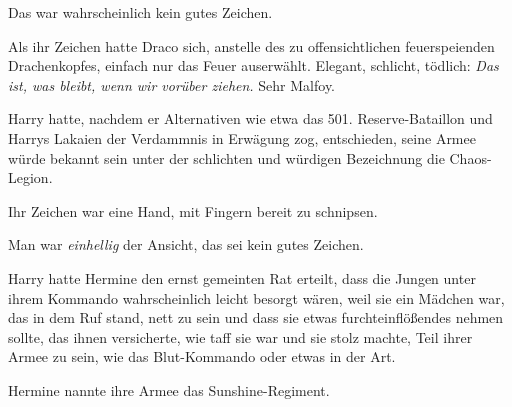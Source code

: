 Das war wahrscheinlich kein gutes Zeichen.

Als ihr Zeichen hatte Draco sich, anstelle des zu offensichtlichen feuerspeienden Drachenkopfes, einfach nur das Feuer auserwählt. Elegant, schlicht, tödlich: \emph{Das ist, was bleibt, wenn wir vorüber ziehen.} Sehr Malfoy.

Harry hatte, nachdem er Alternativen wie etwa das 501. Reserve-Bataillon und Harrys Lakaien der Verdammnis in Erwägung zog, entschieden, seine Armee würde bekannt sein unter der schlichten und würdigen Bezeichnung die Chaos-Legion.%

Ihr Zeichen war eine Hand, mit Fingern bereit zu schnipsen.

Man war \emph{einhellig} der Ansicht, das sei kein gutes Zeichen.

Harry hatte Hermine den ernst gemeinten Rat erteilt, dass die Jungen unter ihrem Kommando wahrscheinlich leicht besorgt wären, weil sie ein Mädchen war, das in dem Ruf stand, nett zu sein und dass sie etwas furchteinflößendes nehmen sollte, das ihnen versicherte, wie taff sie war und sie stolz machte, Teil ihrer Armee zu sein, wie das Blut-Kommando oder etwas in der Art.

Hermine nannte ihre Armee das Sunshine-Regiment.

